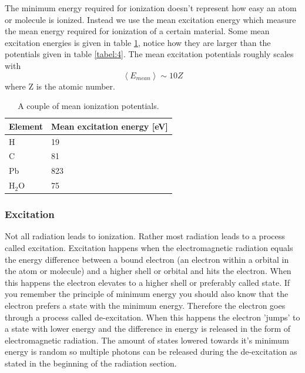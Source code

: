 \documentclass[jmp, amsmath, amssymb, reprint]{article}
\numberwithin{equation}{section}
\begin{document}
\begin{multicols}{2}
The minimum energy required for ionization doesn't represent how easy an atom or molecule is ionized. Instead we use the mean excitation energy which measure the mean energy required for ionization of a certain material. Some mean excitation energies is given in table \ref{tabel:5}, notice how they are larger than the potentials given in table \ref{tabel:4}. The mean excitation potentials roughly scales with
\begin{equation}
\left<E_{mean}\right>\sim 10Z
\end{equation}
where Z is the atomic number.

\begin{table}[H]
  \begin{center}
    \begin{tabular}{| l | l |}
   	\hline
	Element & Mean excitation energy [eV]\\ \hline
	H & 19\\
	C & 81\\
	Pb & 823\\
	H\(_2\)O & 75\\ \hline
	\end{tabular}
    \caption{A couple of mean ionization potentials.}
    \label{tabel:5}
  \end{center}
\end{table}

\subsubsection{Excitation}

Not all radiation leads to ionization. Rather most radiation leads to a process called excitation. Excitation happens when the electromagnetic radiation equals the energy difference between a bound electron (an electron within a orbital in the atom or molecule) and a higher shell or orbital and hits the electron. When this happens the electron elevates to a higher shell or preferably called state. If you remember the principle of minimum energy you should also know that the electron prefers a state with the minimum energy. Therefore the electron goes through a process called de-excitation. When this happens the electron 'jumps' to a state with lower energy and the difference in energy is released in the form of electromagnetic radiation. The amount of states lowered towards it's minimum energy is random so multiple photons can be released during the de-excitation as stated in the beginning of the radiation section.


\end{multicols}
\end{document}
